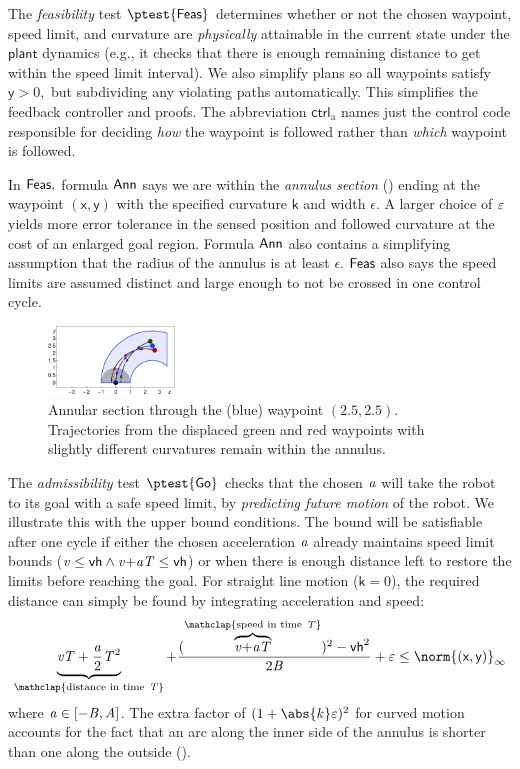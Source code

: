 \documentclass[12pt]{cmuthesis}
\theoremstyle{definition}
\theoremstyle{remark}
\newcommand{\xgvar}{\textsf{x}}
\newcommand{\ygvar}{\textsf{y}}
\newcommand{\kvar}{\textsf{k}}
\newcommand{\vhvar}{\textsf{vh}}
\newcommand{\ctrl}{\textsf{ctrl}\xspace}
\newcommand{\ctrlliv}{\ctrl_{\text{a}}}
\newcommand{\plant}{\textsf{plant}\xspace}
\newcommand{\lnorm}[1]{{{\norm{#1}}_{\infty}}}
\newcommand{\rref}[2][]{\prettyref{#2}}
\begin{document}
The \emph{feasibility} test $\ptest{\planreq}$ determines whether or not the chosen waypoint, speed limit, and curvature are \emph{physically} attainable in the current state under the $\plant$ dynamics (e.g., it checks that there is enough remaining distance to get within the speed limit interval).
We also simplify plans so all waypoints satisfy $\ygvar > 0,$ but subdividing any violating paths automatically.
This simplifies the feedback controller and proofs.
The abbreviation $\ctrlliv$ names just the control code responsible for deciding \emph{how} the waypoint is followed rather than \emph{which} waypoint is followed.


In $\textsf{Feas},$ formula $\textsf{Ann}$ says we are within the \emph{annulus section} (\rref{fig:circlestaging}) ending at the waypoint $(\xgvar, \ygvar)$ with the specified curvature $\kvar$ and width $\epsilon$.
A larger choice of $\varepsilon$ yields more error tolerance in the sensed position and followed curvature at the cost of an enlarged goal region.
Formula $\textsf{Ann}$ also contains a simplifying assumption that the radius of the annulus is at least $\epsilon$.
$\textsf{Feas}$ also says the speed limits are assumed distinct and large enough to not be crossed in one control cycle.

\begin{figure}[h!]
\centering
\includegraphics[width=0.3\textwidth]{graphics/fig-ode3.pdf}
\caption{Annular section through the (blue) waypoint $(2.5,2.5)$. Trajectories from the displaced green and red waypoints with slightly different curvatures remain within the annulus.}\label{fig:circlestaging}
\label{fig:circlestaging}
\end{figure}

The \emph{admissibility} test $\ptest{\admiss}$ checks that the chosen ${\it a}$ will take the robot to its goal with a safe speed limit, by \emph{predicting future motion} of the robot.
We illustrate this with the upper bound conditions.
The bound will be satisfiable after one cycle if either the chosen acceleration ${\it a}$ already maintains speed limit bounds ($\vvar \leq \vhvar \land \vvar{+}\avar\Tvar \leq \vhvar$) or when there is enough distance left to restore the limits before reaching the goal.
For straight line motion ($\kvar=0$), the required distance can simply be found by integrating acceleration and speed:
\begin{equation*}
\underbrace{\vvar\Tvar+\frac{\avar}{2}\Tvar^2}_{\mathclap{\text{distance in time}~\Tvar}} + \frac{(\overbrace{\vvar{+}\avar\Tvar}^{\mathclap{\text{speed in time}~\Tvar}})^2-\vhvar^2}{2\Bvar} + \veps \leq \lnorm{(\xgvar,\ygvar)}
\end{equation*}
where ${\it a} \in [-{\it B},{\it A}]$.
The extra factor of $(1 + \abs{k}\veps)^2$ for curved motion accounts for the fact that an arc along the inner side of the annulus is shorter than one along the outside (\rref{fig:circlestaging}).
\end{document}
